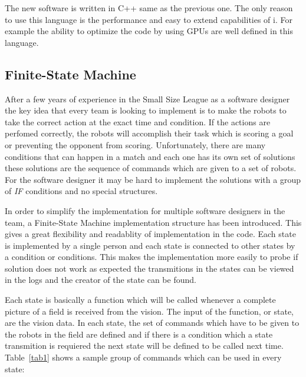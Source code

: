 \documentclass[runningheads]{llncs}
\begin{document}
The new software is written in C++ same as the previous one. The only reason to use this language is the performance and easy to extend capabilities of i. For example the ability to optimize the code by using GPUs are well defined in this language.

\subsection{Finite-State Machine} 
After a few years of experience in the Small Size League as a software designer the key idea that every team is looking to implement is to make the robots to take the correct action at the exact time and condition. If the actions are perfomed correctly, the robots will accomplish their task which is scoring a goal or preventing the opponent from scoring. Unfortunately, there are many conditions that can happen in a match and each one has its own set of solutions these solutions are the sequence of commands which are given to a set of robots. For the software designer it may be hard to implement the solutions with a group of \textit{IF} conditions and no special structures.

In order to simplify the implementation for multiple software designers in the team, a Finite-State Machine implementation structure has been introduced. This gives a great flexibility and readablity of implementation in the code. Each state is implemented by a single person and each state is connected to other states by a condition or conditions. This makes the implementation more easily to probe if solution does not work as expected the transmitions in the states can be viewed in the logs and the creator of the state can be found.

Each state is basically a function which will be called whenever a complete picture of a field is received from the vision. The input of the function, or state, are the vision data.  
In each state, the set of commands which have to be given to the robots in the field are defined and if there is a condition which a state transmition is requiered the next state will be defined to be called next time.
Table~\ref{tab1} shows a sample group of commands which can be used in every state:
\end{document}
